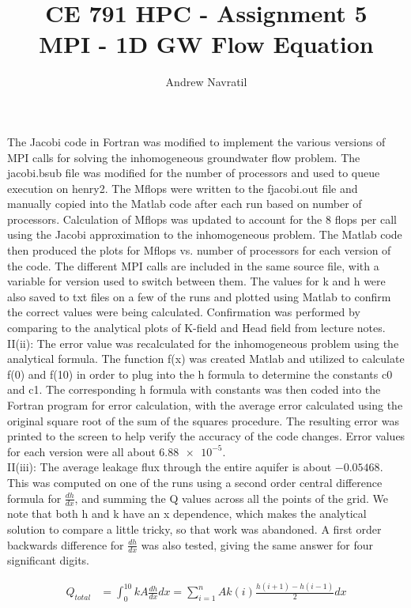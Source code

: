 \documentclass[conf]{new-aiaa}
\title{CE 791 HPC - Assignment 5\\MPI - 1D GW Flow Equation}
\author{Andrew Navratil}
\begin{document}
\maketitle

The Jacobi code in Fortran was modified to implement the various versions of MPI calls for solving the inhomogeneous groundwater flow problem.  The jacobi.bsub file was modified for the number of processors and used to queue execution on henry2.  The Mflops were written to the fjacobi.out file and manually copied into the Matlab code after each run based on number of processors.  Calculation of Mflops was updated to account for the 8 flops per call using the Jacobi approximation to the inhomogeneous problem.  The Matlab code then produced the plots for Mflops vs. number of processors for each version of the code.  The different MPI calls are included in the same source file, with a variable for version used to switch between them.  The values for k and h were also saved to txt files on a few of the runs and plotted using Matlab to confirm the correct values were being calculated.  Confirmation was performed by comparing to the analytical plots of K-field and Head field from lecture notes. \\

II(ii): The error value was recalculated for the inhomogeneous problem using the analytical formula.  The function f(x) was created Matlab and utilized to calculate f(0) and f(10) in order to plug into the h formula to determine the constants c0 and c1.  The corresponding h formula with constants was then coded into the Fortran program for error calculation, with the average error calculated using the original square root of the sum of the squares procedure.  The resulting error was printed to the screen to help verify the accuracy of the code changes.  Error values for each version were all about $\num{6.88e-5}$. \\

II(iii): The average leakage flux through the entire aquifer is about $-0.05468$.  This was computed on one of the runs using a second order central difference formula for $\frac{dh}{dx}$, and summing the Q values across all the points of the grid.  We note that both h and k have an x dependence, which makes the analytical solution to compare a little tricky, so that work was abandoned.  A first order backwards difference for $\frac{dh}{dx}$ was also tested, giving the same answer for four significant digits.

\begin{align*}
	Q_{total} &= \int_{0}^{10} k A \frac{dh}{dx} dx = \sum_{i=1}^{n} A k(i) 
		\frac{h(i+1) - h(i-1)}{2} dx
\end{align*}
\end{document}

